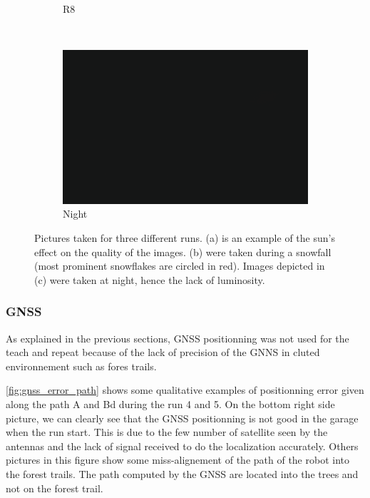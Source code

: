 \begin{figure}[htpb]
\begin{center}
\begin{subfigure}[b]{0.32\textwidth}
			\caption{R8}
			\label{fig:cameras_b}
		\end{subfigure}
		~
		\begin{subfigure}[b]{0.32\textwidth}
			\includegraphics[width=\linewidth]{figs/camera/figure_camera_dark_bottom.pdf}
			\caption{Night}
			\label{fig:cameras_c}
		\end{subfigure}%
	\caption{Pictures taken for three different runs. (a) is an example of the sun's effect on the quality of the images. (b) were taken during a snowfall (most prominent snowflakes are circled in red). Images depicted in (c) were taken at night, hence the lack of luminosity.} 
	\label{fig:cameras_expo}
	\end{center}
\end{figure}

\subsubsection{GNSS}
\label{sec:res_gnss}

As explained in the previous sections, \ac{GNSS} positionning was not used for the teach and repeat because of the lack of precision of the \ac{GNNS} in cluted environnement such as fores trails.

\autoref{fig:gnss_error_path} shows some qualitative examples of positionning error given along the path A and Bd during the run 4 and 5.
On the bottom right side picture, we can clearly see that the \ac{GNSS} positionning is not good in the garage when the run start. 
This is due to the few number of satellite seen by the antennas and the lack of signal received to do the localization accurately.
Others pictures in this figure show some miss-alignement of the path of the robot into the forest trails.
The path computed by the \ac{GNSS} are located into the trees and not on the forest trail.

